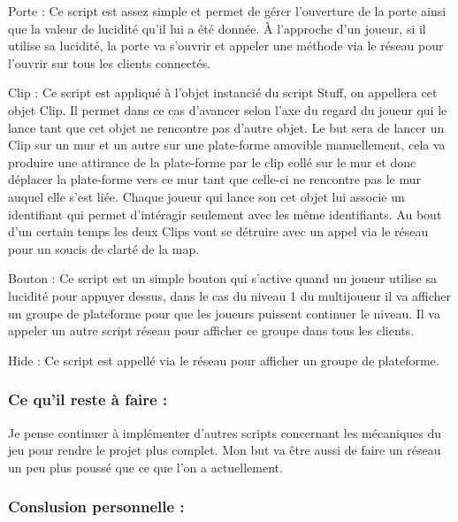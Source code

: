 \documentclass{article}
\begin{document}
Porte : Ce script est assez simple et permet de gérer l’ouverture de la porte ainsi que la valeur de lucidité qu’il lui a été donnée. À l’approche d’un joueur, si il utilise sa lucidité, la porte va s’ouvrir et appeler une méthode via le réseau pour l’ouvrir sur tous les clients connectés.

Clip : Ce script est appliqué à l’objet instancié du script Stuff, on appellera cet objet Clip. Il permet dans ce cas d’avancer selon l’axe du regard du joueur qui le lance tant que cet objet ne rencontre pas d’autre objet. Le but sera de lancer un Clip sur un mur et un autre sur une plate-forme amovible manuellement, cela va produire une attirance de la plate-forme par le clip collé sur le mur et donc déplacer la plate-forme vers ce mur tant que celle-ci ne rencontre pas le mur auquel elle s’est liée. Chaque joueur qui lance son cet objet lui associe un identifiant qui permet d’intéragir seulement avec les même identifiants. Au bout d’un certain temps les deux Clips vont se détruire avec un appel via le réseau pour un soucis de clarté de la map.

Bouton : Ce script est un simple bouton qui s’active quand un joueur utilise sa lucidité pour appuyer dessus, dans le cas du niveau 1 du multijoueur il va afficher un groupe de plateforme pour que les joueurs puissent continuer le niveau. Il va appeler un autre script réseau pour afficher ce groupe dans tous les clients.

Hide : Ce script est appellé via le réseau pour afficher un groupe de plateforme.


\quad 

\quad

		\subsubsection{Ce qu'il reste à faire :}

\quad

\quad

Je pense continuer à  implémenter d’autres scripts concernant les mécaniques du jeu pour rendre le projet plus complet. Mon but va être aussi de faire un réseau un peu plus poussé que ce que l’on a actuellement.


	\subsubsection{Conslusion personnelle :}

\quad

\quad
\end{document}
